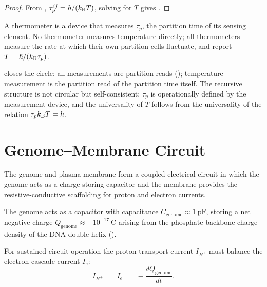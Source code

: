 \begin{proof}
From , $\tau_p^{ij} = \hbar/(k_{\mathrm{B}} T)$, solving for $T$
gives .
\end{proof}

\begin{corollary}
\label{cor:thermometry}
A thermometer is a device that measures $\tau_p$, the partition time of its
sensing element.  No thermometer measures temperature directly; all thermometers
measure the rate at which their own partition cells fluctuate, and report
$T = \hbar/(k_{\mathrm{B}}\tau_p)$.
\end{corollary}

 closes the circle: all measurements are partition reads
(); temperature measurement is the partition read of the
partition time itself.  The recursive structure is not circular but
self-consistent: $\tau_p$ is operationally defined by the measurement device,
and the universality of $T$ follows from the universality of the relation
$\tau_p k_{\mathrm{B}} T = \hbar$.

\section{Genome--Membrane Circuit}
\label{sec:ch03-genome-membrane}

The genome and plasma membrane form a coupled electrical circuit in which the
genome acts as a charge-storing capacitor and the membrane provides the
resistive-conductive scaffolding for proton and electron currents.

\begin{definition}
\label{def:ch03-genome-capacitance}
The genome acts as a capacitor with capacitance
$C_\mathrm{genome} \approx 1~\mathrm{pF}$, storing a net negative charge
$Q_\mathrm{genome} \approx -10^{-17}~\mathrm{C}$ arising from the
phosphate-backbone charge density of the DNA double helix
().
\end{definition}

\begin{theorem}
\label{thm:ch03-charge-balance}
For sustained circuit operation the proton transport current $I_{H^+}$ must
balance the electron cascade current $I_e$:
\begin{equation}
    I_{H^+} \;=\; I_e \;=\; -\frac{dQ_\mathrm{genome}}{dt}.
    \label{eq:ch03-charge-balance}
\end{equation}
\end{theorem}

